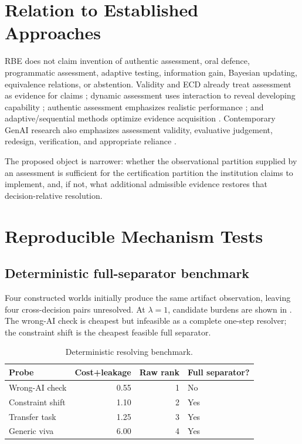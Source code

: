 \documentclass[11pt]{article}
\begin{document}
\section{Relation to Established Approaches}
RBE does not claim invention of authentic assessment, oral defence, programmatic assessment, adaptive testing, information gain, Bayesian updating, equivalence relations, or abstention. Validity and ECD already treat assessment as evidence for claims \parencite{messick1995validity,mislevy2003ecd}; dynamic assessment uses interaction to reveal developing capability \parencite{allal2000zpd,poehner2011validity}; authentic assessment emphasizes realistic performance \parencite{gulikers2004authentic}; and adaptive/sequential methods optimize evidence acquisition \parencite{vanderlinden2010,wald1947}. Contemporary GenAI research also emphasizes assessment validity, evaluative judgement, redesign, verification, and appropriate reliance \parencite{bearman2024evaluative,khlaif2025redesign,ali2026validity,bannister2025pandora,fok2024verifiability,passi2024reliance}.

The proposed object is narrower: whether the observational partition supplied by an assessment is sufficient for the certification partition the institution claims to implement, and, if not, what additional admissible evidence restores that decision-relative resolution.

\section{Reproducible Mechanism Tests}
\subsection{Deterministic full-separator benchmark}
Four constructed worlds initially produce the same artifact observation, leaving four cross-decision pairs unresolved. At $\lambda=1$, candidate burdens are shown in . The wrong-AI check is cheapest but infeasible as a complete one-step resolver; the constraint shift is the cheapest feasible full separator.
\begin{table}[t]\centering
\caption{Deterministic resolving benchmark.}\label{tab:det}
\begin{tabular}{lrrl}\toprule Probe & Cost+leakage & Raw rank & Full separator?\\\midrule
Wrong-AI check & 0.55 & 1 & No\\
Constraint shift & 1.10 & 2 & Yes\\
Transfer task & 1.25 & 3 & Yes\\
Generic viva & 6.00 & 4 & Yes\\\bottomrule\end{tabular}
\end{table}
\end{document}
